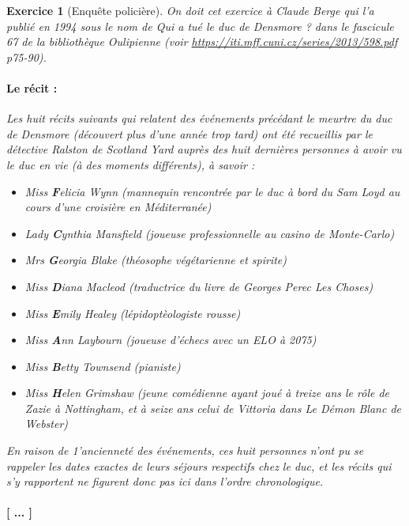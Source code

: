 \documentclass{article}
\theoremstyle{exostyle}
\newtheorem{exo}{Exercice}
\theoremstyle{partiestyle}
\theoremstyle{questionstyle}
\begin{document}


\begin{exo}[Enquête policière]
	On doit cet exercice à Claude Berge qui l'a publié en 1994 sous le nom de {\em Qui a tué le duc de Densmore ?} dans le fascicule 67 de la bibliothèque Oulipienne (voir \url{https://iti.mff.cuni.cz/series/2013/598.pdf} p75-90).
	
	\paragraph{Le récit :}
	{\em
		Les huit récits suivants qui relatent des événements précédant le meurtre du duc
		de Densmore (découvert plus d’une année trop tard) ont été recueillis par le détective
		Ralston de Scotland Yard auprès des huit dernières personnes à avoir vu le duc en vie
		(à des moments différents), à savoir :	\\
		\begin{itemize}
		\item Miss {\bf F}elicia Wynn (mannequin rencontrée par le duc à bord du Sam Loyd au cours
		d’une croisière en Méditerranée)
		\item Lady {\bf C}ynthia Mansfield (joueuse professionnelle au casino de Monte-Carlo)
		\item Mrs {\bf G}eorgia Blake (théosophe végétarienne et spirite)
		\item Miss {\bf D}iana Macleod (traductrice du livre de Georges Perec {\em Les Choses})
		\item Miss {\bf E}mily Healey (lépidoptèologiste rousse)
		\item Miss {\bf A}nn Laybourn (joueuse d’échecs avec un ELO à 2075)
		\item Miss {\bf B}etty Townsend (pianiste)
		\item Miss {\bf H}elen Grimshaw (jeune comédienne ayant joué à treize ans le rôle de Zazie à
		Nottingham, et à seize ans celui de Vittoria dans Le Démon Blanc de Webster)
		\end{itemize}
	    En raison de 1’ancienneté des événements, ces huit personnes n’ont pu se rappeler
		les dates exactes de leurs séjours respectifs chez le duc, et les récits qui s’y rapportent
		ne figurent donc pas ici dans l’ordre chronologique.
	}
	\paragraph{[ ... ]}

\end{exo}
\end{document}
